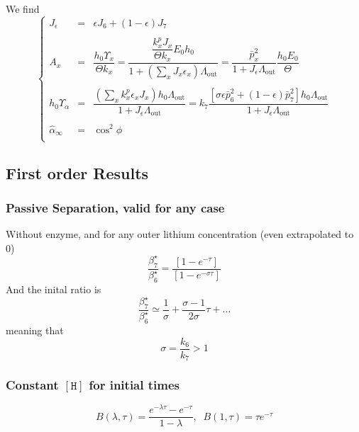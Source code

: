 \documentclass[aps,onecolumn,12pt]{revtex4}
\newcommand{\mychem}[1]{\mathtt{#1}}
\newcommand{\myconc}[1]{\left\lbrack{#1}\right\rbrack}
\newcommand{\spproton}{\mychem{H}}
\newcommand{\proton}{\myconc{\spproton}}
\newcommand{\LiAll}{\Lambda}
\newcommand{\LiAllOut}{{\LiAll}_{\mathrm{out}}}
\begin{document}
We find
\begin{equation}
\left\lbrace
\begin{array}{ccl}
	J_\epsilon & = & \epsilon J_6 + (1-\epsilon) J_7 \\
	\\
	A_x & = & \dfrac{h_0\Upsilon_x}{\Theta k_x} = \dfrac{\dfrac{k_x^p J_x}{\Theta k_x}   E_0 h_0}{1+\left(\sum_x J_x \epsilon_x \right) \LiAllOut} =  \dfrac{\bar{p}_x^2}{1+J_\epsilon \LiAllOut} \dfrac{h_0 E_0}{\Theta} \\
	\\
	h_0\Upsilon_\alpha & = & \dfrac{\left(\sum_x k_x^p \epsilon_x J_x \right)h_0\LiAllOut}{1+J_\epsilon\LiAllOut} = 
	 k_7 \dfrac{\left[\sigma \epsilon \bar{p}_6^2 + (1-\epsilon) \bar{p}_7^2 \right] h_0 \LiAllOut }{1+J_\epsilon \LiAllOut}  \\
	 \\
	\hat{\alpha}_\infty & = & \cos^2 \phi\\
\end{array}
\right.
\end{equation}

\subsection{First order Results}

\subsubsection{Passive Separation, valid for any case}
Without enzyme, and for any outer lithium concentration (even extrapolated to 0)
\begin{equation}
	\dfrac{\beta_7^\star}{\beta_6^\star} = \dfrac{  \left[1-e^{-\tau}\right]}{  \left[1-e^{-\sigma\tau}\right]}
\end{equation}
And the inital ratio is
\begin{equation}
	\dfrac{\beta_7^\star}{\beta_6^\star} \simeq \dfrac{1}{\sigma} + \dfrac{\sigma-1}{2\sigma} \tau + \ldots
\end{equation}
meaning that 
\begin{equation}
	\sigma = \dfrac{k_6}{k_7} > 1
\end{equation}

\subsubsection{Constant $\proton$ for initial times}
\begin{equation}
	B(\lambda,\tau) = \dfrac{e^{-\lambda\tau}-e^{-\tau}}{1-\lambda},\;\;B(1,\tau) = \tau e^{-\tau}
\end{equation}
\end{document}
